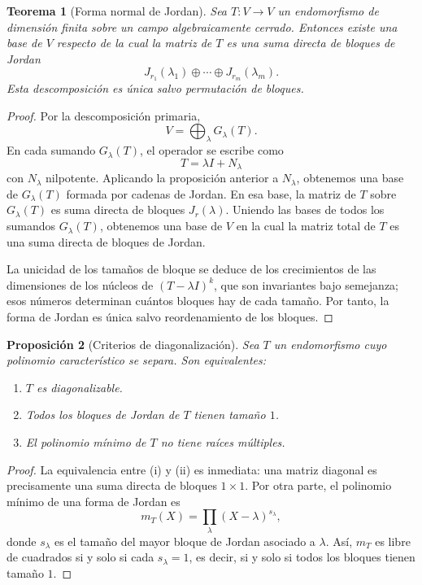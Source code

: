 \documentclass[10pt,a4paper,oneside]{article}
\theoremstyle{plain}
\newtheorem{theorem}{Teorema}[section]
\newtheorem{proposition}[theorem]{Proposición}
\theoremstyle{definition}
\theoremstyle{remark}
\begin{document}
\begin{theorem}[Forma normal de Jordan]
Sea \(T:V\to V\) un endomorfismo de dimensión finita sobre un campo algebraicamente cerrado. Entonces existe una base de \(V\) respecto de la cual la matriz de \(T\) es una suma directa de bloques de Jordan
\[
J_{r_1}(\lambda_1)\oplus \cdots \oplus J_{r_m}(\lambda_m).
\]
Esta descomposición es única salvo permutación de bloques.
\end{theorem}

\begin{proof}
Por la descomposición primaria,
\[
V=\bigoplus_{\lambda} G_\lambda(T).
\]
En cada sumando \(G_\lambda(T)\), el operador se escribe como
\[
T=\lambda I+N_\lambda
\]
con \(N_\lambda\) nilpotente. Aplicando la proposición anterior a \(N_\lambda\), obtenemos una base de \(G_\lambda(T)\) formada por cadenas de Jordan. En esa base, la matriz de \(T\) sobre \(G_\lambda(T)\) es suma directa de bloques \(J_r(\lambda)\). Uniendo las bases de todos los sumandos \(G_\lambda(T)\), obtenemos una base de \(V\) en la cual la matriz total de \(T\) es una suma directa de bloques de Jordan.

La unicidad de los tamaños de bloque se deduce de los crecimientos de las dimensiones de los núcleos de \((T-\lambda I)^k\), que son invariantes bajo semejanza; esos números determinan cuántos bloques hay de cada tamaño. Por tanto, la forma de Jordan es única salvo reordenamiento de los bloques.
\end{proof}

\begin{proposition}[Criterios de diagonalización]
Sea \(T\) un endomorfismo cuyo polinomio característico se separa. Son equivalentes:
\begin{enumerate}[label=\textup{(\roman*)}]
\item \(T\) es diagonalizable.
\item Todos los bloques de Jordan de \(T\) tienen tamaño \(1\).
\item El polinomio mínimo de \(T\) no tiene raíces múltiples.
\end{enumerate}
\end{proposition}

\begin{proof}
La equivalencia entre \textup{(i)} y \textup{(ii)} es inmediata: una matriz diagonal es precisamente una suma directa de bloques \(1\times 1\). Por otra parte, el polinomio mínimo de una forma de Jordan es
\[
m_T(X)=\prod_{\lambda}(X-\lambda)^{s_\lambda},
\]
donde \(s_\lambda\) es el tamaño del mayor bloque de Jordan asociado a \(\lambda\). Así, \(m_T\) es libre de cuadrados si y solo si cada \(s_\lambda=1\), es decir, si y solo si todos los bloques tienen tamaño \(1\).
\end{proof}
\end{document}
